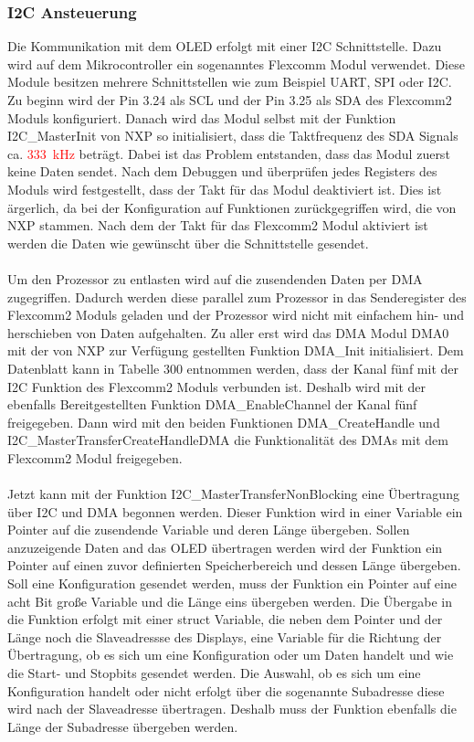\subsubsection{I2C Ansteuerung}\label{sec:OLEDI2C}

Die Kommunikation mit dem \ac{OLED} erfolgt mit einer \ac{I2C} Schnittstelle. Dazu wird auf dem Mikrocontroller ein sogenanntes Flexcomm Modul verwendet. Diese Module besitzen mehrere Schnittstellen wie zum Beispiel UART, SPI oder \ac{I2C}. Zu beginn wird der Pin 3.24 als SCL und der Pin 3.25 als SDA des Flexcomm2 Moduls konfiguriert. Danach wird das Modul selbst mit der Funktion \glqq I2C\_MasterInit\grqq{} von NXP so initialisiert, dass die Taktfrequenz des SDA Signals ca. \textcolor{red}{\SI{333}{\kilo\hertz}} beträgt. Dabei ist das Problem entstanden, dass das Modul zuerst keine Daten sendet. Nach dem Debuggen und überprüfen jedes Registers des Moduls wird festgestellt, dass der Takt für das Modul deaktiviert ist. Dies ist ärgerlich, da bei der Konfiguration auf Funktionen zurückgegriffen wird, die von NXP stammen. Nach dem der Takt für das Flexcomm2 Modul aktiviert ist werden die Daten wie gewünscht über die Schnittstelle gesendet.\\\\ Um den Prozessor zu entlasten wird auf die zusendenden Daten per \ac{DMA} zugegriffen. Dadurch werden diese parallel zum Prozessor in das Senderegister des Flexcomm2 Moduls geladen und der Prozessor wird nicht mit einfachem hin- und herschieben von Daten aufgehalten. Zu aller erst wird das \ac{DMA} Modul DMA0 mit der von NXP zur Verfügung gestellten Funktion \glqq DMA\_Init\grqq{} initialisiert. Dem Datenblatt kann in Tabelle 300 entnommen werden, dass der Kanal fünf mit der \ac{I2C} Funktion des Flexcomm2 Moduls verbunden ist. Deshalb wird mit der ebenfalls Bereitgestellten Funktion \glqq DMA\_EnableChannel \grqq{} der Kanal fünf freigegeben. Dann wird mit den beiden Funktionen \glqq DMA\_CreateHandle\grqq{} und \glqq I2C\_MasterTransferCreateHandleDMA\grqq{} die Funktionalität des \ac{DMA}s mit dem Flexcomm2 Modul freigegeben.\\\\ Jetzt kann mit der Funktion \glqq I2C\_MasterTransferNonBlocking\grqq{} eine Übertragung über \ac{I2C} und \ac{DMA} begonnen werden. Dieser Funktion wird in einer Variable ein Pointer auf die zusendende Variable und deren Länge übergeben. Sollen anzuzeigende Daten and das \ac{OLED} übertragen werden wird der Funktion ein Pointer auf einen zuvor definierten Speicherbereich und dessen Länge übergeben. Soll eine Konfiguration gesendet werden, muss der Funktion ein Pointer auf eine acht Bit große Variable und die Länge eins übergeben werden. Die Übergabe in die Funktion erfolgt mit einer \glqq struct\grqq{} Variable, die neben dem Pointer und der Länge noch die Slaveadressse des Displays, eine Variable für die Richtung der Übertragung, ob es sich um eine Konfiguration oder um Daten handelt und wie die Start- und Stopbits gesendet werden. Die Auswahl, ob es sich um eine Konfiguration handelt oder nicht erfolgt über die sogenannte Subadresse diese wird nach der Slaveadresse übertragen. Deshalb muss der Funktion ebenfalls die Länge der Subadresse übergeben werden.

